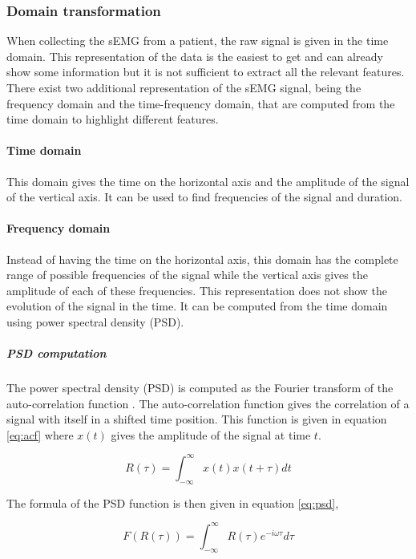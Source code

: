 \documentclass{article}
\begin{document}
\subsubsection{Domain transformation}

When collecting the sEMG from a patient, the raw signal is given in the time domain. This representation of the data is the easiest to get and can already show some information but it is not sufficient to extract all the relevant features. There exist two additional representation of the sEMG signal, being the frequency domain and the time-frequency domain, that are computed from the time domain to highlight different features.

\paragraph{Time domain}
This domain gives the time on the horizontal axis and the amplitude of the signal of the vertical axis. It can be used to find frequencies of the signal and duration. \cite{ref:classification4}

\paragraph{Frequency domain}
Instead of having the time on the horizontal axis, this domain has the complete range of possible frequencies of the signal while the vertical axis gives the amplitude of each of these frequencies. This representation does not show the evolution of the signal in the time. It can be computed from the time domain using power spectral density (PSD).\cite{ref:classification4}

\subparagraph{PSD computation}
The power spectral density (PSD) is computed as the Fourier transform of the auto-correlation function \cite{ref:masterThesisCedricSimar}. The auto-correlation function gives the correlation of a signal with itself in a shifted time position. This function is given in equation \ref{eq:acf} where $x(t)$ gives the amplitude of the signal at time $t$.

\begin{equation}
    R(\tau) = \int_{-\infty}^{\infty}x(t) x(t + \tau) dt
    \label{eq:acf}
\end{equation}

The formula of the PSD function is then given in equation \ref{eq:psd},

\begin{equation}
    F(R(\tau)) = \int_{-\infty}^{\infty} R(\tau) e^{-i \omega \tau} d \tau
    \label{eq:psd}
\end{equation}
\end{document}

